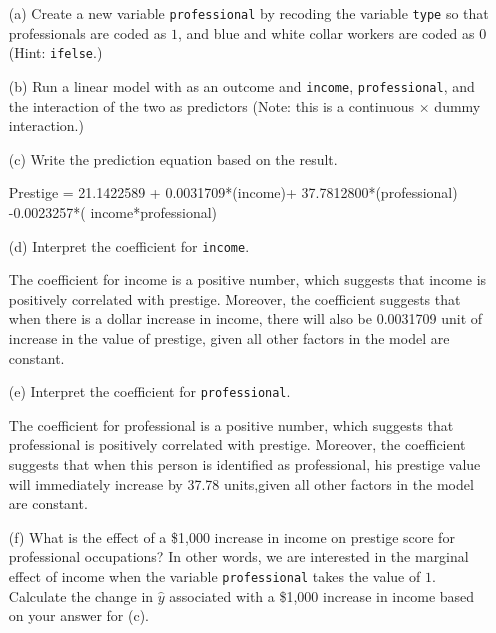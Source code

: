 \documentclass[12pt,letterpaper]{article}
\begin{document}
\newpage
\begin{enumerate}
	
	\item [(a)]
	Create a new variable \texttt{professional} by recoding the variable \texttt{type} so that professionals are coded as $1$, and blue and white collar workers are coded as $0$ (Hint: \texttt{ifelse}.)
	
		  
	
	\vspace{6cm}
	
	
	
	
	\item [(b)]
	Run a linear model with  as an outcome and \texttt{income}, \texttt{professional}, and the interaction of the two as predictors (Note: this is a continuous $\times$ dummy interaction.)
	
	
		  
	
	
	
	\vspace{6cm}
	\item [(c)]
	Write the prediction equation based on the result.
	
	Prestige =  21.1422589 + 0.0031709*(income)+ 37.7812800*(professional) -0.0023257*( income*professional)
	
\newpage
	\item [(d)]
	Interpret the coefficient for \texttt{income}.
	
	The coefficient for income is a positive number, which suggests that income is positively correlated with prestige. Moreover, the coefficient suggests that when there is a dollar increase in income, there will also be 0.0031709 unit of increase in the value of prestige, given all other factors in the model are constant.
	
	\vspace{4cm}	
	\item [(e)]
	Interpret the coefficient for \texttt{professional}.
	
	The coefficient for professional is a positive number, which suggests that professional is positively correlated with prestige. Moreover, the coefficient suggests that when this person is identified as professional, his prestige value will immediately increase by 37.78 units,given all other factors in the model are constant.
	
	\newpage
	\item [(f)]
	What is the effect of a \$1,000 increase in income on prestige score for professional occupations? In other words, we are interested in the marginal effect of income when the variable \texttt{professional} takes the value of $1$. Calculate the change in $\hat{y}$ associated with a \$1,000 increase in income based on your answer for (c).
	

\end{enumerate}
\end{document}
